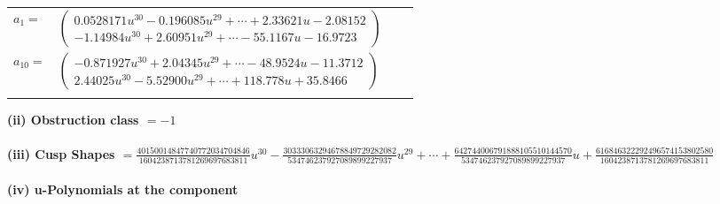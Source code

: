 \documentclass[1p]{elsarticle_modified}
\theoremstyle{definition}
\begin{document}
\begin{tabular}{m{7pt} m{180pt} m{7pt} m{180pt} }
\flushright $a_{1}=$&$\begin{pmatrix}0.0528171 u^{30}-0.196085 u^{29}+\cdots+2.33621 u-2.08152\\-1.14984 u^{30}+2.60951 u^{29}+\cdots-55.1167 u-16.9723\end{pmatrix}$ \\
\flushright $a_{10}=$&$\begin{pmatrix}-0.871927 u^{30}+2.04345 u^{29}+\cdots-48.9524 u-11.3712\\2.44025 u^{30}-5.52900 u^{29}+\cdots+118.778 u+35.8466\end{pmatrix}$\\&\end{tabular}
\flushleft \textbf{(ii) Obstruction class $= -1$}\\~\\
\flushleft \textbf{(iii) Cusp Shapes $= \frac{40150014847740772034704846}{1604238713781269697683811} u^{30}-\frac{30333063294678849729282082}{534746237927089899227937} u^{29}+\cdots+\frac{642744006791888105510144570}{534746237927089899227937} u+\frac{616846322292496574153802580}{1604238713781269697683811}$}\\~\\
\newpage\renewcommand{\arraystretch}{1}
\flushleft \textbf{(iv) u-Polynomials at the component}\newline \\
\end{document}
